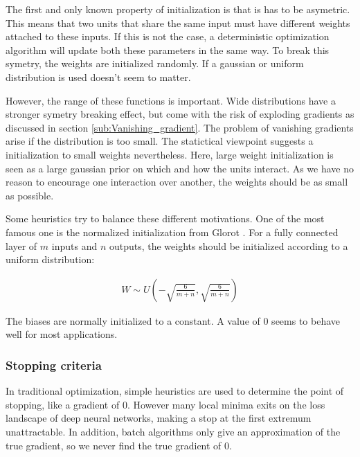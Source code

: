 The first and only known property of initialization is that is has to be
asymetric. This means that two units that share the same input must have
different weights attached to these inputs. If this is not the case, a
deterministic optimization algorithm will update both these parameters in the
same way. To break this symetry, the weights are initialized randomly. If a
gaussian or uniform distribution is used doesn't seem to matter.

However, the range of these functions is important. Wide distributions have a
stronger symetry breaking effect, but come with the risk of exploding gradients
as discussed in section \ref{sub:Vanishing_gradient}. The problem of vanishing
gradients arise if the distribution is too small. The statictical viewpoint
suggests a initialization to small weights nevertheless. Here, large weight
initialization is seen as a large gaussian prior on which and how the units
interact. As we have no reason to encourage one interaction over another, the
weights should be as small as possible. 

Some heuristics try to balance these different motivations. One of the most
famous one is the normalized initialization from Glorot
\cite{glorot2010understanding}. For a fully connected layer of $m$ inputs and
$n$ outputs, the weights should be initialized according to a uniform
distribution:

\begin{align}
    W \sim U(-\sqrt{\frac{6}{m+n}}, \sqrt{\frac{6}{m+n}})
\end{align}

The biases are normally initialized to a constant. A value of 0 seems to behave
well for most applications.




\subsubsection{Stopping criteria}\label{sub:Stopping_criteria}
In traditional optimization, simple heuristics are used to determine the point
of stopping, like a gradient of 0. However many local minima exits on the loss
landscape of deep neural networks, making a stop at the first extremum
unattractable. In addition, batch algorithms only give an approximation of the
true gradient, so we never find the true gradient of 0.

